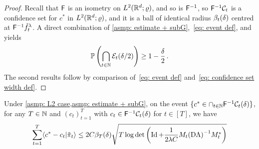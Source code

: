 \begin{proof}
    Recall that $\mathsf{F}$ is an isometry on $L^2(\mathbb{R}^d;\varrho)$, and so is $\mathsf{F}^{-1}$, so $\mathsf{F}^{-1}\mathcal{C}_t$ is a confidence set for $c^*$ in $L^2(\mathbb{R}^d;\varrho)$, and it is a ball of identical radius $\beta_t(\delta)$ centred at $\mathsf{F}^{-1} \hat f_t^\lambda$. 
    A direct combination of \cref{asmp: estimate + subG},~\eqref{eq: event def}, and~\cite[Cor.~3.6]{abbasi-yadkori_online_2012} yields 
    \[
        \mathbb{P}\left(\bigcap_{t\in\mathbb{N}} \mathcal{E}_t(\delta/2)\right)\ge 1-\frac\delta2\,.
    \]
    The second results follow by comparison of~\eqref{eq: event def} and~\eqref{eq: confidence set width def}.
\end{proof}



\begin{lemma}\label{lemma: bound on width term}
    Under \cref{asmp: L2 case,asmp: estimate + subG}, on the event $\{c^*\in \cap_{t\in\mathbb{N}}\mathsf{F}^{-1}\mathcal{C}_t(\delta)\}$, for any $T\in\mathbb{N}$ and ${(c_t)}_{t=1}^T$ with $c_t\in\mathsf{F}^{-1}\mathcal{C}_t(\delta)$ for $t\in[T]$, we have
    \[
        \sum_{t=1}^T\langle c^* - c_t\vert \tilde\pi_t\rangle \le 2C\beta_T(\delta)\sqrt{T\log\det\left(\operatorname{Id} + \frac{1}{2\lambda C}M_t{(\mathrm{D}\Lambda)}^{-1}M_t^*\right)}
    \]
\end{lemma}
